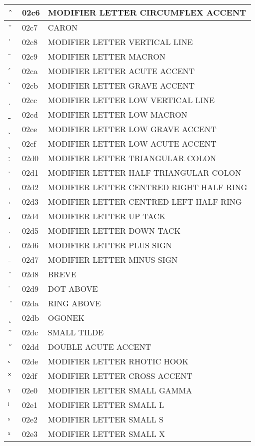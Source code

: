 \documentclass[12pt,letterpaper,openany]{book}
\begin{document}
\begin{center}
\begin{supertabular}{|m{0.25in}|m{0.5in}|m{4in}|}
			ˆ & 02c6 & MODIFIER LETTER CIRCUMFLEX ACCENT\\\hline
			ˇ & 02c7 & CARON\\\hline
			ˈ & 02c8 & MODIFIER LETTER VERTICAL LINE\\\hline
			ˉ & 02c9 & MODIFIER LETTER MACRON\\\hline
			ˊ & 02ca & MODIFIER LETTER ACUTE ACCENT\\\hline
			ˋ & 02cb & MODIFIER LETTER GRAVE ACCENT\\\hline
			ˌ & 02cc & MODIFIER LETTER LOW VERTICAL LINE\\\hline
			ˍ & 02cd & MODIFIER LETTER LOW MACRON\\\hline
			ˎ & 02ce & MODIFIER LETTER LOW GRAVE ACCENT\\\hline
			ˏ & 02cf & MODIFIER LETTER LOW ACUTE ACCENT\\\hline
			ː & 02d0 & MODIFIER LETTER TRIANGULAR COLON\\\hline
			ˑ & 02d1 & MODIFIER LETTER HALF TRIANGULAR COLON\\\hline
			˒ & 02d2 & MODIFIER LETTER CENTRED RIGHT HALF RING\\\hline
			˓ & 02d3 & MODIFIER LETTER CENTRED LEFT HALF RING\\\hline
			˔ & 02d4 & MODIFIER LETTER UP TACK\\\hline
			˕ & 02d5 & MODIFIER LETTER DOWN TACK\\\hline
			˖ & 02d6 & MODIFIER LETTER PLUS SIGN\\\hline
			˗ & 02d7 & MODIFIER LETTER MINUS SIGN\\\hline
			˘ & 02d8 & BREVE\\\hline
			˙ & 02d9 & DOT ABOVE\\\hline
			˚ & 02da & RING ABOVE\\\hline
			˛ & 02db & OGONEK\\\hline
			˜ & 02dc & SMALL TILDE\\\hline
			˝ & 02dd & DOUBLE ACUTE ACCENT\\\hline
			˞ & 02de & MODIFIER LETTER RHOTIC HOOK\\\hline
			˟ & 02df & MODIFIER LETTER CROSS ACCENT\\\hline
			ˠ & 02e0 & MODIFIER LETTER SMALL GAMMA\\\hline
			ˡ & 02e1 & MODIFIER LETTER SMALL L\\\hline
			ˢ & 02e2 & MODIFIER LETTER SMALL S\\\hline
			ˣ & 02e3 & MODIFIER LETTER SMALL X\\\hline

\end{supertabular}
\end{center}
\end{document}
